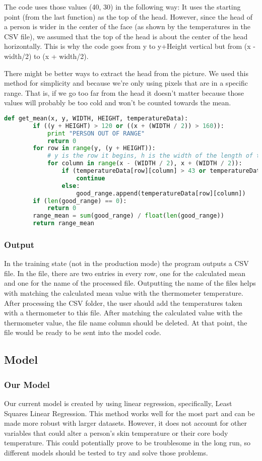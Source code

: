 	The code uses those values (40, 30) in the following way: It uses the starting point (from the last function) as the top of the head. However, since the head of a person is wider in the center of the face (as shown by the temperatures in the CSV file), we assumed that the top of the head is about the center of the head horizontally. This is why the code goes from y to y+Height vertical but from (x - width/2) to (x + width/2). 
	
	There might be better ways to extract the head from the picture. We used this method for simplicity and because we’re only using pixels that are in a specific range. That is, if we go too far from the head it doesn't matter because those values will probably be too cold and won’t be counted towards the mean. 
	\begin{lstlisting}[language=Python, caption=Python example]
	def get_mean(x, y, WIDTH, HEIGHT, temperatureData):
		if ((y + HEIGHT) > 120 or ((x + (WIDTH / 2)) > 160)):
			print "PERSON OUT OF RANGE"
			return 0
		for row in range(y, (y + HEIGHT)):
			# y is the row it begins, h is the width of the length of the head
			for column in range(x - (WIDTH / 2), x + (WIDTH / 2)):
				if (temperatureData[row][column] > 43 or temperatureData[row][column] < 35):
					continue
				else:
					good_range.append(temperatureData[row][column])
		if (len(good_range) == 0):
			return 0
		range_mean = sum(good_range) / float(len(good_range))
		return range_mean
	\end{lstlisting}
	
\subsubsection*{Output}
	In the training state (not in the production mode) the program outputs a CSV file. In the file, there are two entries in every row, one for the calculated mean and one for the name of the processed file. Outputting the name of the files helps with matching the calculated mean value with the thermometer temperature. After processing the CSV folder, the user should add the temperatures taken with a thermometer to this file. After matching the calculated value with the thermometer value, the file name column should be deleted. At that point, the file would be ready to be sent into the model code. 
\subsection*{Model}
\subsubsection*{Our Model}
	Our current model is created by using linear regression, specifically, Least Squares Linear Regression. This method works well for the most part and can be made more robust with larger datasets. However, it does not account for other variables that could alter a person’s skin temperature or their core body temperature. This could potentially prove to be troublesome in the long run, so different models should be tested to try and solve those problems.

